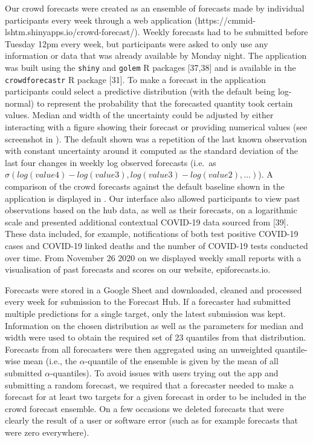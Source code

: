 \documentclass[10pt,letterpaper]{article}
\begin{document}
Our crowd forecasts were created as an ensemble of forecasts made by
individual participants every week through a web application
(https://cmmid-lshtm.shinyapps.io/crowd-forecast/). Weekly forecasts had
to be submitted before Tuesday 12pm every week, but participants were
asked to only use any information or data that was already available by
Monday night. The application was built using the \texttt{shiny} and
\texttt{golem} R packages {[}37,38{]} and is available in the
\texttt{crowdforecastr} R package {[}31{]}. To make a forecast in the
application participants could select a predictive distribution (with
the default being log-normal) to represent the probability that the
forecasted quantity took certain values. Median and width of the
uncertainty could be adjusted by either interacting with a figure
showing their forecast or providing numerical values (see screenshot in
). The default shown was a repetition of the
last known observation with constant uncertainty around it computed as
the standard deviation of the last four changes in weekly log observed
forecasts (i.e.~as
\(\sigma(log(value4) - log(value3), log(value3) - log(value2), \ldots )\)).
A comparison of the crowd forecasts against the default baseline shown
in the application is displayed in .
Our interface also allowed participants to view past observations based
on the hub data, as well as their forecasts, on a logarithmic scale and
presented additional contextual COVID-19 data sourced from {[}39{]}.
These data included, for example, notifications of both test positive
COVID-19 cases and COVID-19 linked deaths and the number of COVID-19
tests conducted over time. From November 26 2020 on we displayed weekly
small reports with a visualisation of past forecasts and scores on our
website, epiforecasts.io.

Forecasts were stored in a Google Sheet and downloaded, cleaned and
processed every week for submission to the Forecast Hub. If a forecaster
had submitted multiple predictions for a single target, only the latest
submission was kept. Information on the chosen distribution as well as
the parameters for median and width were used to obtain the required set
of 23 quantiles from that distribution. Forecasts from all forecasters
were then aggregated using an unweighted quantile-wise mean (i.e., the
\(\alpha\)-quantile of the ensemble is given by the mean of all
submitted \(\alpha\)-quantiles). To avoid issues with users trying out
the app and submitting a random forecast, we required that a forecaster
needed to make a forecast for at least two targets for a given forecast
in order to be included in the crowd forecast ensemble. On a few
occasions we deleted forecasts that were clearly the result of a user or
software error (such as for example forecasts that were zero
everywhere).
\end{document}
